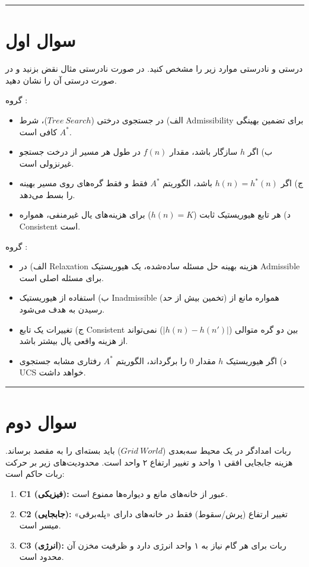 \documentclass[a4paper,10pt]{article}
\newcommand{\GroupA}{\noindent \textcolor{AccentGold}{گروه \lr{a}}}
\newcommand{\GroupB}{\noindent\textcolor{AccentCyan}{گروه \lr{b}}}
\begin{document}
\vspace{2pt}
\textcolor{AccentCyan}{\rule{\linewidth}{0.8pt}}
\section{\textcolor{AccentGold}{سوال اول}}
درستی و نادرستی موارد زیر را مشخص کنید. در صورت نادرستی مثال نقض بزنید و در صورت درستی آن را نشان دهید.

\GroupA:
\begin{itemize}
	\item 
	الف) در جستجوی درختی ($Tree\ Search$)، شرط Admissibility برای تضمین بهینگی $A^*$ کافی است.
	\item 
	ب) اگر $h$ سازگار باشد، مقدار $f(n)$ در طول هر مسیر از درخت جستجو غیرنزولی است.
	\item 
	ج) اگر $h(n)=h^*(n)$ باشد، الگوریتم $A^*$ فقط و فقط گره‌های روی مسیر بهینه را بسط می‌دهد.
	\item 
	د) هر تابع هیوریستیک ثابت ($h(n)=K$) برای هزینه‌های یال غیرمنفی، همواره Consistent است.
\end{itemize}
\GroupB:
\begin{itemize}
	\item 
	الف) در Relaxation هزینه بهینه حل مسئله ساده‌شده، یک هیوریستیک Admissible برای مسئله اصلی است.
	\item 
	ب) استفاده از هیوریستیک Inadmissible (تخمین بیش از حد) همواره مانع از رسیدن به هدف می‌شود.
	\item 
	ج) تغییرات یک تابع Consistent بین دو گره متوالی ($|h(n) - h(n')|$) نمی‌تواند از هزینه واقعی یال بیشتر باشد.
	\item 
	د) اگر هیوریستیک $h$ مقدار $0$ را برگرداند، الگوریتم $A^*$ رفتاری مشابه جستجوی UCS خواهد داشت.
\end{itemize}
\textcolor{AccentCyan}{\rule{\linewidth}{0.4pt}}
\section{\textcolor{AccentGold}{سوال دوم}}

 ربات امدادگر در یک محیط سه‌بعدی ($Grid\ World$) باید بسته‌ای را به مقصد برساند. هزینه جابجایی افقی ۱ واحد و تغییر ارتفاع ۲ واحد است. محدودیت‌های زیر بر حرکت ربات حاکم است:
\begin{enumerate}
	\item \textbf{C1 (فیزیکی):} عبور از خانه‌های مانع و دیواره‌ها ممنوع است.
	\item \textbf{C2 (جابجایی):} تغییر ارتفاع (پرش/سقوط) فقط در خانه‌های دارای «پله‌برقی» میسر است.
	\item \textbf{C3 (انرژی):} ربات برای هر گام نیاز به ۱ واحد انرژی دارد و ظرفیت مخزن آن محدود است.
\end{enumerate}
\end{document}
